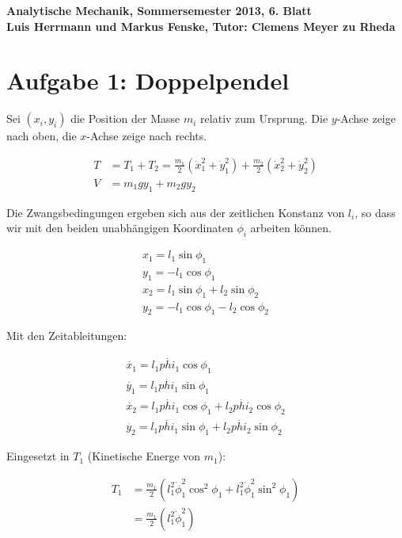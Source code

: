\documentclass[a4paper,german,12pt,smallheadings]{scrartcl}
\begin{document}
\begin{center}
\bfseries %
\sffamily %
\vspace{-40pt}
Analytische Mechanik, Sommersemester 2013, 6. Blatt \\
Luis Herrmann und Markus Fenske, Tutor: Clemens Meyer zu Rheda
\vspace{-10pt}
\end{center}
\section*{Aufgabe 1: Doppelpendel}

Sei $(x_i, y_i)$ die Position der Masse $m_i$ relativ zum Ursprung. Die
$y$-Achse zeige nach oben, die $x$-Achse zeige nach rechts.

\begin{align*}
  T &= T_1 + T_2 = \frac{m_1}{2} (\dot{x}_1^2 + \dot{y}_1^2) + \frac{m_2}{2} (\dot{x}_2^2 + \dot{y}_2^2) \\
  V &= m_1gy_1 + m_2gy_2
\end{align*}

Die Zwangsbedingungen ergeben sich aus der zeitlichen Konstanz von $l_i$, so
dass wir mit den beiden unabhängigen Koordinaten $\phi_i$ arbeiten können.

\begin{align*}
  x_1 =  l_1 \sin \phi_1 \\
  y_1 = -l_1 \cos \phi_1 \\
  x_2 =  l_1 \sin \phi_1 + l_2 \sin \phi_2 \\
  y_2 = -l_1 \cos \phi_1 - l_2 \cos \phi_2
\end{align*}

Mit den Zeitableitungen:

\begin{align*}
  \dot{x_1} = l_1 \dot{phi_1} \cos \phi_1 \\
  \dot{y_1} = l_1 \dot{phi_1} \sin \phi_1 \\
  \dot{x_2} = l_1 \dot{phi_1} \cos \phi_1 + l_2 \dot{phi_2} \cos \phi_2\\
  \dot{y_2} = l_1 \dot{phi_1} \sin \phi_1 + l_2 \dot{phi_2} \sin \phi_2
\end{align*}

Eingesetzt in $T_1$ (Kinetische Energe von $m_1$):

\begin{align*}
  T_1 &= \frac{m_1}{2} (l_1^2 \dot{\phi}_1^2 \cos^2 \phi_1 + l_1^2 \dot{\phi}_1^2 \sin^2 \phi_1) \\
    &= \frac{m_1}{2} (l_1^2 \dot{\phi}_1^2)
\end{align*}
\end{document}
